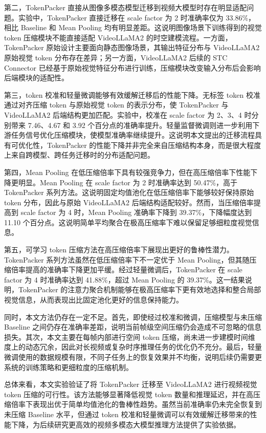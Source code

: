 第二，TokenPacker 直接从图像多模态模型迁移到视频大模型时存在明显适配问题。实验中，TokenPacker 直接迁移在 scale factor 为 2 时准确率仅为 33.86\%，相比 Baseline 和 Mean Pooling 均有明显差距。这说明图像场景下训练得到的视觉 token 压缩模块不能直接适配 VideoLLaMA2 的时空建模流程。一方面，TokenPacker 原始设计主要面向静态图像场景，其输出特征分布与 VideoLLaMA2 原始视觉 token 分布存在差异；另一方面，VideoLLaMA2 后续的 STC Connector 已经基于原始视觉特征分布进行训练，压缩模块改变输入分布后会影响后端模块的适配性。

第三，token 校准和轻量微调能够有效缓解迁移后的性能下降。无标签 token 校准通过对齐压缩 token 与原始视觉 token 的表示分布，使 TokenPacker 与 VideoLLaMA2 后端结构更加匹配。实验中，校准在 scale factor 为 2、3、4 时分别带来 7.46、4.67 和 3.92 个百分点的准确率提升。轻量监督微调则进一步利用下游任务信号优化压缩模块，使模型准确率继续提升。这说明本文提出的迁移流程具有可优化性，TokenPacker 的性能下降并非完全来自压缩结构本身，而是很大程度上来自跨模型、跨任务迁移时的分布适配问题。

第四，Mean Pooling 在低压缩倍率下具有较强竞争力，但在高压缩倍率下性能下降更明显。Mean Pooling 在 scale factor 为 2 时准确率达到 50.47\%，高于 TokenPacker 系列方法。这说明固定均值池化在低压缩倍率下能够较好保持原始 token 分布，因此与原始 VideoLLaMA2 后端结构适配较好。然而，当压缩倍率提高到 scale factor 为 4 时，Mean Pooling 准确率下降到 39.37\%，下降幅度达到 11.10 个百分点。这说明简单平均聚合在极高压缩率下难以保留足够细粒度视觉信息。

第五，可学习 token 压缩方法在高压缩倍率下展现出更好的鲁棒性潜力。TokenPacker 系列方法虽然在低压缩倍率下不一定优于 Mean Pooling，但其随压缩倍率提高的准确率下降更加平缓。经过轻量微调后，TokenPacker 在 scale factor 为 4 时准确率达到 41.88\%，超过 Mean Pooling 的 39.37\%。这一结果说明，TokenPacker 的注意力聚合机制能够在极高压缩率下更有效地选择和整合局部视觉信息，从而表现出比固定池化更好的信息保持能力。

同时，本文方法仍存在一定不足。首先，即使经过校准和微调，压缩模型与未压缩 Baseline 之间仍存在准确率差距，说明当前帧级空间压缩仍会造成不可忽略的信息损失。其次，本文主要在每帧内部进行空间 token 压缩，尚未进一步建模时间维度上的动态冗余，因此对长视频或复杂时序推理任务的优化仍不充分。最后，轻量微调使用的数据规模有限，不同子任务上的恢复效果并不均衡，说明后续仍需要更系统的训练策略和更细粒度的压缩机制。

总体来看，本文实验验证了将 TokenPacker 迁移至 VideoLLaMA2 进行视频视觉 token 压缩的可行性。该方法能够显著降低视觉 token 数量和推理延迟，并在高压缩倍率下表现出优于简单均值池化的鲁棒性趋势。虽然当前准确率仍未完全恢复到未压缩 Baseline 水平，但通过 token 校准和轻量微调可以有效缓解迁移带来的性能下降，为后续研究更高效的视频多模态大模型推理方法提供了实验依据。
